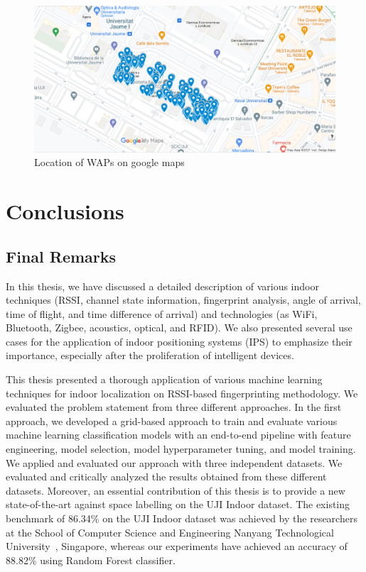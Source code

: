 \documentclass[a4paper,singleside,12pt]{report} %
\begin{document}
		\begin{figure}[!htb]
			\centering
			\includegraphics[width=1\linewidth]{./figures/google_maps_waps.png}
			\caption{Location of WAPs on google maps}
			 \label{fig5.17}
		\end{figure}


	\chapter{Conclusions}
		\section{Final Remarks}

			In this thesis, we have discussed a detailed description of various indoor techniques (RSSI, channel state information, fingerprint analysis, angle of arrival, time of flight, and time difference of arrival) and technologies (as WiFi, Bluetooth, Zigbee, acoustics, optical, and RFID). 
			We also presented several use cases for the application of indoor positioning systems (IPS) to emphasize their importance, especially after the proliferation of intelligent devices.
			
			This thesis presented a thorough application of various machine learning techniques for indoor localization on RSSI-based fingerprinting methodology. 
			We evaluated the problem statement from three different approaches. 
			In the first approach, we developed a grid-based approach to train and evaluate various machine learning classification models with an end-to-end pipeline with feature engineering, model selection, model hyperparameter tuning, and model training. 
			We applied and evaluated our approach with three independent datasets. 
			We evaluated and critically analyzed the results obtained from these different datasets. 
			Moreover, an essential contribution of this thesis is to provide a new state-of-the-art against space labelling on the UJI Indoor dataset. 
			The existing benchmark of 86.34\% on the UJI Indoor dataset was achieved by the researchers at the School of Computer Science and Engineering Nanyang Technological University~\cite{yean2020feature}, Singapore, whereas our experiments have achieved an accuracy of 88.82\% using Random Forest classifier.
			
\end{document}
